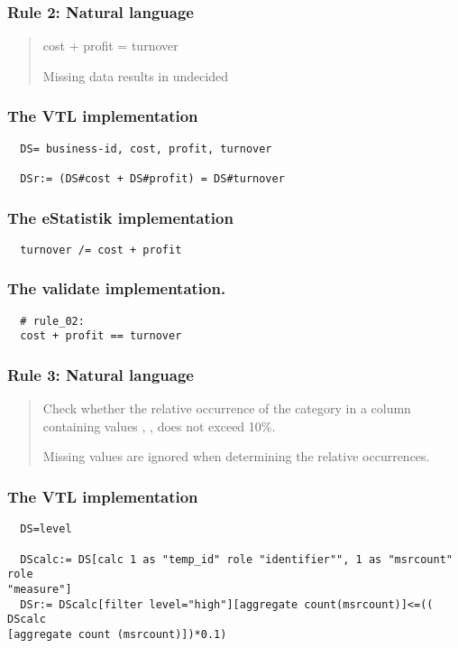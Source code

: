 \newpage

\subsubsection*{  Rule 2: Natural language}
\begin{quote}


cost + profit = turnover

Missing data results in undecided



\end{quote}
\subsubsection*{The VTL implementation}
\begin{verbatim}
  DS= business-id, cost, profit, turnover

  DSr:= (DS#cost + DS#profit) = DS#turnover
\end{verbatim}
\subsubsection*{The eStatistik implementation}
\begin{verbatim}
  turnover /= cost + profit
\end{verbatim}
\subsubsection*{The validate implementation.}
\begin{verbatim}
  # rule_02:
  cost + profit == turnover
\end{verbatim}


\newpage

\subsubsection*{  Rule 3: Natural language}
\begin{quote}


Check whether the relative occurrence of the category  in a column containing values , ,  does not exceed 10\%.

Missing values are ignored when determining the relative occurrences.


\end{quote}
\subsubsection*{The VTL implementation}
\begin{verbatim}
  DS=level

  DScalc:= DS[calc 1 as "temp_id" role "identifier"", 1 as "msrcount" role
"measure"]
  DSr:= DScalc[filter level="high"][aggregate count(msrcount)]<=(( DScalc
[aggregate count (msrcount)])*0.1)
\end{verbatim}
